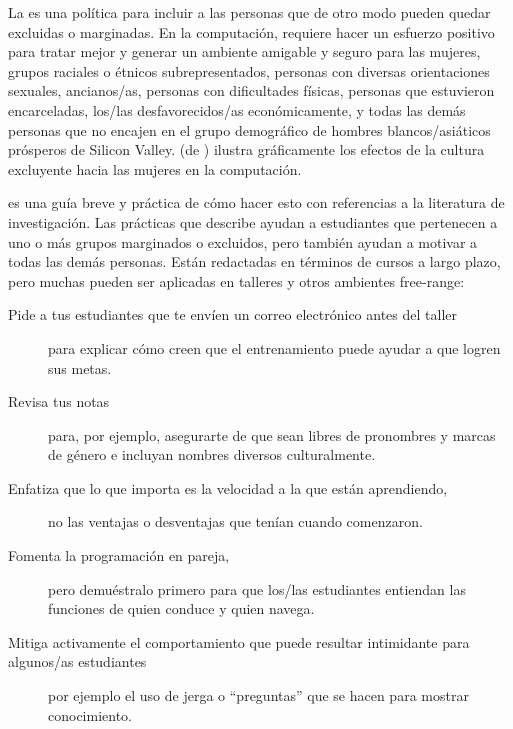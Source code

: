 La  es una política para
incluir a las personas que de otro modo pueden quedar excluidas o marginadas.
En la computación,
requiere hacer un esfuerzo positivo para tratar mejor y generar un ambiente amigable y seguro para las mujeres,
grupos raciales o étnicos subrepresentados,
personas con diversas orientaciones sexuales,
ancianos/as,
personas con dificultades físicas,
personas que estuvieron encarceladas,
los/las desfavorecidos/as económicamente,
y todas las demás personas que no encajen en el grupo demográfico de hombres blancos/asiáticos prósperos de Silicon Valley.
 (de )
ilustra gráficamente los efectos de la cultura excluyente hacia las mujeres en la computación.

\cite{Lee2017} es una guía breve y práctica de cómo hacer esto con referencias a la literatura de investigación.
Las prácticas que describe ayudan a estudiantes que pertenecen a uno o más grupos marginados o excluidos,
pero también ayudan a motivar a todas las demás personas.
Están redactadas en términos de cursos a largo plazo,
pero muchas pueden ser aplicadas en talleres y otros ambientes free-range:

\begin{description}

\item[Pide a tus estudiantes que te envíen un correo electrónico antes del taller]
  para explicar cómo creen que el entrenamiento puede ayudar a que logren sus metas.

\item[Revisa tus notas]
  para, por ejemplo, asegurarte de que sean libres de pronombres y marcas de género e incluyan nombres diversos culturalmente.

\item[Enfatiza que lo que importa es la velocidad a la que están aprendiendo,]
  no las ventajas o desventajas que tenían cuando comenzaron.

\item[Fomenta la programación en pareja,]
  pero demuéstralo primero para que los/las estudiantes entiendan las funciones de quien conduce y quien navega.

\item[Mitiga activamente el comportamiento que puede resultar intimidante para algunos/as estudiantes]
  por ejemplo el uso de jerga o ``preguntas'' que se hacen para mostrar conocimiento.

\end{description}

